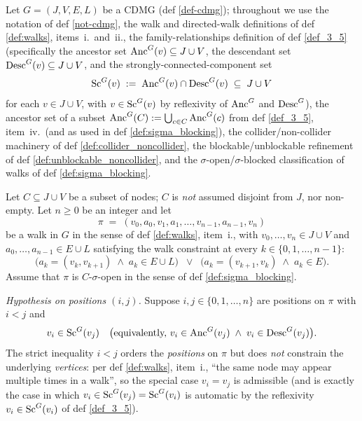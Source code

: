 \begin{Lem}[LabelRoman]\label{lem:replace_walk}
    Let $G = (J, V, E, L)$ be a CDMG (def \ref{def-cdmg}); throughout we use the notation of def \ref{not-cdmg}, the walk and directed-walk definitions of def \ref{def:walks}, items~i.\ and~ii., the family-relationships definition of def \ref{def_3_5} (specifically the ancestor set $\mathrm{Anc}^G(v) \subseteq J \cup V$, the descendant set $\mathrm{Desc}^G(v) \subseteq J \cup V$, and the strongly-connected-component set
    \[
        \mathrm{Sc}^G(v) \;:=\; \mathrm{Anc}^G(v) \cap \mathrm{Desc}^G(v) \;\subseteq\; J \cup V
    \]
    for each $v \in J \cup V$, with $v \in \mathrm{Sc}^G(v)$ by reflexivity of $\mathrm{Anc}^G$ and $\mathrm{Desc}^G$), the ancestor set of a subset $\mathrm{Anc}^G(C) := \bigcup_{c \in C} \mathrm{Anc}^G(c)$ from def \ref{def_3_5}, item~iv.\ (and as used in def \ref{def:sigma_blocking}), the collider/non-collider machinery of def \ref{def:collider_noncollider}, the blockable/unblockable refinement of def \ref{def:unblockable_noncollider}, and the $\sigma$-open/$\sigma$-blocked classification of walks of def \ref{def:sigma_blocking}.

    Let $C \subseteq J \cup V$ be a subset of nodes; $C$ is \emph{not} assumed disjoint from $J$, nor non-empty. Let $n \ge 0$ be an integer and let
    \[
        \pi \;=\; (v_0, a_0, v_1, a_1, \dots, v_{n-1}, a_{n-1}, v_n)
    \]
    be a walk in $G$ in the sense of def \ref{def:walks}, item~i., with $v_0, \dots, v_n \in J \cup V$ and $a_0, \dots, a_{n-1} \in E \cup L$ satisfying the walk constraint at every $k \in \{0, 1, \dots, n - 1\}$:
    \[
        \bigl(a_k = (v_k, v_{k+1}) \;\land\; a_k \in E \cup L\bigr)
        \;\;\lor\;\;
        \bigl(a_k = (v_{k+1}, v_k) \;\land\; a_k \in E\bigr).
    \]
    Assume that $\pi$ is $C$-$\sigma$-open in the sense of def \ref{def:sigma_blocking}.

    \emph{Hypothesis on positions $(i, j)$.}
    Suppose $i, j \in \{0, 1, \dots, n\}$ are positions on $\pi$ with $i < j$ and
    \[
        v_i \in \mathrm{Sc}^G(v_j) \quad\bigl(\text{equivalently, } v_i \in \mathrm{Anc}^G(v_j) \;\land\; v_i \in \mathrm{Desc}^G(v_j)\bigr).
    \]
    The strict inequality $i < j$ orders the \emph{positions} on $\pi$ but does \emph{not} constrain the underlying \emph{vertices}: per def \ref{def:walks}, item~i., ``the same node may appear multiple times in a walk'', so the special case $v_i = v_j$ is admissible (and is exactly the case in which $v_i \in \mathrm{Sc}^G(v_j) = \mathrm{Sc}^G(v_i)$ is automatic by the reflexivity $v_i \in \mathrm{Sc}^G(v_i)$ of def \ref{def_3_5}).


\end{Lem}
